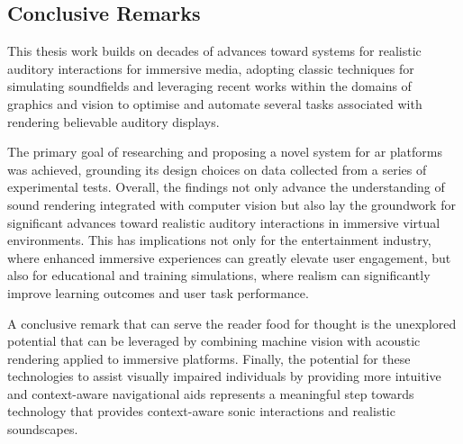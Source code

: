 \subsection{Conclusive Remarks}
This thesis work builds on decades of advances toward systems for realistic auditory interactions for immersive media, adopting classic techniques for simulating soundfields and leveraging recent works within the domains of graphics and vision to optimise and automate several tasks associated with rendering believable auditory displays.\par
The primary goal of researching and proposing a novel system for \acrshort{ar} platforms was achieved, grounding its design choices on data collected from a series of experimental tests. Overall, the findings not only advance the understanding of sound rendering integrated with computer vision but also lay the groundwork for significant advances toward realistic auditory interactions in immersive virtual environments. This has implications not only for the entertainment industry, where enhanced immersive experiences can greatly elevate user engagement, but also for educational and training simulations, where realism can significantly improve learning outcomes and user task performance.\par
A conclusive remark that can serve the reader food for thought is the unexplored potential that can be leveraged by combining machine vision with acoustic rendering applied to immersive platforms. Finally, the potential for these technologies to assist visually impaired individuals by providing more intuitive and context-aware navigational aids represents a meaningful step towards technology that provides context-aware sonic interactions and realistic soundscapes.
